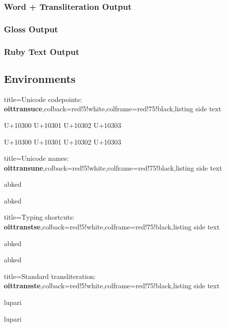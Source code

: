 \documentclass{article}
\newcommand\bqq[1]{\begin{quotation}#1\end{quotation}}
\begin{document}
\subsubsection{Word + Transliteration Output}
\bqq{}

\subsubsection{Gloss Output}
\bqq{}


\subsubsection{Ruby Text Output}
\bqq{}

\oitshowshort

\subsection{Environments}

\bigskip
\begin{tcblisting}{title={{\sffamily Unicode codepoints: \bfseries\textcolor{blue!10}{oittransuce}}},colback=red!5!white,colframe=red!75!black,listing side text}
\begin{oittransuce}
U+10300 U+10301 U+10302 U+10303

U+10300 U+10301 U+10302 U+10303
\end{oittransuce}
\end{tcblisting}

\bigskip
\begin{tcblisting}{title={{\sffamily Unicode names: \bfseries\textcolor{blue!10}{oittransune}}},colback=red!5!white,colframe=red!75!black,listing side text}
\begin{oittransune}
abked

abked
\end{oittransune}
\end{tcblisting}

\bigskip
\begin{tcblisting}{title={{\sffamily Typing shortcuts: \bfseries\textcolor{blue!10}{oittranstse}}},colback=red!5!white,colframe=red!75!black,listing side text}
\begin{oittranstse}
abked

abked
\end{oittranstse}
\end{tcblisting}

\bigskip
\begin{tcblisting}{title={{\sffamily Standard transliteration: \bfseries\textcolor{blue!10}{oittransste}}},colback=red!5!white,colframe=red!75!black,listing side text}
\begin{oittransste}
lupari

lupari
\end{oittransste}
\end{tcblisting}
\end{document}
